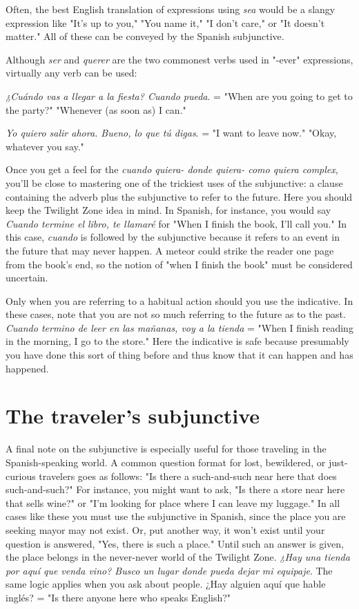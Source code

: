 \documentclass[14pt,a4paper,oneside]{memoir}
\newcommand{\bsk}{\vspace{20pt}}
\newcommand{\indu}{\hspace{20pt}}
\begin{document}
\bsk

Often, the best English translation of expressions using \emph{sea}
would be a slangy expression like "It's up to you," "You name it," "I
don't care," or "It doesn't matter." All of these can be conveyed by the
Spanish subjunctive.

Although \emph{ser} and \emph{querer} are the two commonest verbs used in
"-ever" expressions, virtually any verb can be used:

\bsk

\indu \emph{¿Cuándo vas a llegar a la fiesta? Cuando pueda}. = "When are
you going to get to the party?" "Whenever (as soon as)
I can."

\indu \emph{Yo quiero salir ahora. Bueno, lo que tú digas}. = "I want to
leave now." "Okay, whatever you say."

\bsk

Once you get a feel for the \emph{cuando quiera- donde quiera- como quiera complex}, you'll be close to mastering one of the trickiest uses of the subjunctive: a clause containing the adverb plus the
subjunctive to refer to the future. Here you should keep the Twilight
Zone idea in mind. In Spanish, for instance, you would say \emph{Cuando
	termine el libro, te llamaré} for "When I finish the book, I'll call you."
In this case, \emph{cuando} is followed by the subjunctive because it refers to
an event in the future that may never happen. A meteor could strike
the reader one page from the book's end, so the notion of "when I finish the book" must be considered uncertain.

Only when you are referring to a habitual action should you
use the indicative. In these cases, note that you are not so much referring to the future as to the past. \emph{Cuando termino de leer en las mañanas, voy a la tienda} = "When I finish reading in the morning, I go
to the store." Here the indicative is safe because presumably you have
done this sort of thing before and thus know that it can happen and has
happened.

\section{The traveler's subjunctive}

A final note on the subjunctive is especially useful for those
traveling in the Spanish-speaking world. A common question format
for lost, bewildered, or just-curious travelers goes as follows: "Is there
a such-and-such near here that does such-and-such?" For instance, you
might want to ask, "Is there a store near here that sells wine?" or "I'm
looking for place where I can leave my luggage." In all cases like these
you must use the subjunctive in Spanish, since the place you are seeking mayor may not exist. Or, put another way, it won't exist until your
question is answered, "Yes, there is such a place." Until such an answer is given, the place belongs in the never-never world of the Twilight Zone.
\emph{¿Hay una tienda por aquí que venda vino? Busco un lugar
	donde pueda dejar mi equipaje}. The same logic applies when you ask
about people. ¿Hay alguien aquí que hable inglés? = "Is there anyone
here who speaks English?"
\end{document}
